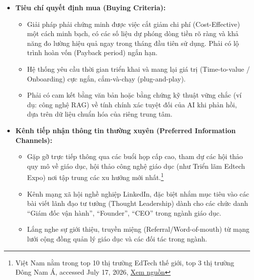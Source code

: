 \begin{itemize}
\begin{itemize}
        \item \textit{Rủi ro thương hiệu:} Ám ảnh với việc AI có thể ``ảo giác'' (hallucinate) và cung cấp thông tin sai lệch cho khách hàng về học phí, cam kết điểm số, gây ra khủng hoảng truyền thông hoặc các rắc rối về pháp lý, hợp đồng.

        \item \textit{Bảo mật \& Quyền riêng tư:} Sự e ngại về việc bảo mật cơ sở dữ liệu khách hàng (lead data) và tài liệu nội bộ khi giao phó cho một nền tảng bên thứ ba.
    \end{itemize}

    \item \textbf{Tiêu chí quyết định mua (Buying Criteria):}
    \begin{itemize}
        \item Giải pháp phải chứng minh được việc cắt giảm chi phí (Cost-Effective) một cách minh bạch, có các số liệu dự phóng dòng tiền rõ ràng và khả năng đo lường hiệu quả ngay trong tháng đầu tiên sử dụng. Phải có lộ trình hoàn vốn (Payback period) ngắn hạn.

        \item Hệ thống yêu cầu thời gian triển khai và mang lại giá trị (Time-to-value / Onboarding) cực ngắn, cắm-và-chạy (plug-and-play).

        \item Phải có cam kết bằng văn bản hoặc bằng chứng kỹ thuật vững chắc (ví dụ: công nghệ RAG) về tính chính xác tuyệt đối của AI khi phản hồi, dựa trên dữ liệu chuẩn hóa của riêng trung tâm.
    \end{itemize}

    \item \textbf{Kênh tiếp nhận thông tin thường xuyên (Preferred Information Channels):}
    \begin{itemize}
        \item Gặp gỡ trực tiếp thông qua các buổi họp cấp cao, tham dự các hội thảo quy mô về giáo dục, hội thảo công nghệ giáo dục (như Triển lãm Edtech Expo) nơi tập trung các xu hướng mới nhất.\footnote{Việt Nam nằm trong top 10 thị trường EdTech thế giới, top 3 thị trường Đông Nam Á, accessed July 17, 2026, \href{https://vneconomy.vn/techconnect/viet-nam-nam-trong-top-10-thi-truong-edtech-the-gioi-top-3-thi-truong-dong-nam-a.htm}{Xem nguồn}}

        \item Kênh mạng xã hội nghề nghiệp LinkedIn, đặc biệt nhắm mục tiêu vào các bài viết lãnh đạo tư tưởng (Thought Leadership) dành cho các chức danh ``Giám đốc vận hành'', ``Founder'', ``CEO'' trong ngành giáo dục.

        \item Lắng nghe sự giới thiệu, truyền miệng (Referral/Word-of-mouth) từ mạng lưới cộng đồng quản lý giáo dục và các đối tác trong ngành.
    \end{itemize}
\end{itemize}

